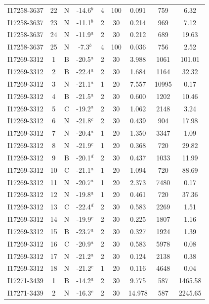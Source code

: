 \begin{table}
\begin{tabular}{ccccccccc}
I17258-3637 & 22 & N & -14.6$^{b}$ & 4 & 100 & 0.091 & 759 & 6.32 \\
I17258-3637 & 23 & N & -11.1$^{b}$ & 2 & 30 & 0.214 & 969 & 7.12 \\
I17258-3637 & 24 & N & -11.9$^{a}$ & 2 & 30 & 0.212 & 689 & 19.63 \\
I17258-3637 & 25 & N & -7.3$^{b}$ & 4 & 100 & 0.036 & 756 & 2.52 \\
I17269-3312 & 1 & B & -20.5$^{a}$ & 2 & 30 & 3.988 & 1061 & 101.01 \\
I17269-3312 & 2 & B & -22.4$^{a}$ & 2 & 30 & 1.684 & 1164 & 32.32 \\
I17269-3312 & 3 & N & -21.1$^{a}$ & 1 & 20 & 7.557 & 10995 & 0.17 \\
I17269-3312 & 4 & B & -21.5$^{a}$ & 2 & 30 & 0.600 & 1202 & 10.46 \\
I17269-3312 & 5 & C & -19.2$^{a}$ & 2 & 30 & 1.062 & 2148 & 3.24 \\
I17269-3312 & 6 & N & -21.8$^{c}$ & 2 & 30 & 0.439 & 904 & 17.98 \\
I17269-3312 & 7 & N & -20.4$^{a}$ & 1 & 20 & 1.350 & 3347 & 1.09 \\
I17269-3312 & 8 & N & -21.9$^{c}$ & 1 & 20 & 0.368 & 720 & 29.82 \\
I17269-3312 & 9 & B & -20.1$^{d}$ & 2 & 30 & 0.437 & 1033 & 11.99 \\
I17269-3312 & 10 & C & -21.1$^{a}$ & 1 & 20 & 1.094 & 720 & 88.69 \\
I17269-3312 & 11 & N & -20.7$^{a}$ & 1 & 20 & 2.373 & 7480 & 0.17 \\
I17269-3312 & 12 & N & -19.8$^{a}$ & 1 & 20 & 0.461 & 720 & 37.36 \\
I17269-3312 & 13 & C & -22.4$^{d}$ & 2 & 30 & 0.583 & 2269 & 1.51 \\
I17269-3312 & 14 & N & -19.9$^{c}$ & 2 & 30 & 0.225 & 1807 & 1.16 \\
I17269-3312 & 15 & B & -23.7$^{a}$ & 2 & 30 & 0.327 & 1924 & 1.39 \\
I17269-3312 & 16 & C & -20.9$^{a}$ & 2 & 30 & 0.583 & 5978 & 0.08 \\
I17269-3312 & 17 & N & -21.2$^{a}$ & 2 & 30 & 0.124 & 2138 & 0.38 \\
I17269-3312 & 18 & N & -21.2$^{c}$ & 1 & 20 & 0.116 & 4648 & 0.04 \\
I17271-3439 & 1 & B & -14.2$^{a}$ & 2 & 30 & 9.775 & 587 & 1465.58 \\
I17271-3439 & 2 & N & -16.3$^{c}$ & 2 & 30 & 14.978 & 587 & 2245.65 \\

\end{tabular}
\end{table}
